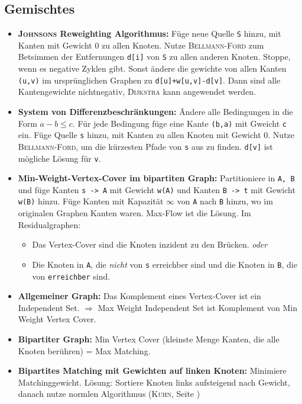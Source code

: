 \subsection{Gemischtes}
\begin{itemize}
	\item \textbf{\textsc{Johnsons} Reweighting Algorithmus:}
	Füge neue Quelle \lstinline{S} hinzu, mit Kanten mit Gewicht 0 zu allen Knoten.
	Nutze \textsc{Bellmann-Ford} zum Betsimmen der Entfernungen \lstinline{d[i]} von \lstinline{S} zu allen anderen Knoten.
	Stoppe, wenn es negative Zyklen gibt.
	Sonst ändere die gewichte von allen Kanten \lstinline{(u,v)} im ursprünglichen Graphen zu \lstinline{d[u]+w[u,v]-d[v]}.
	Dann sind alle Kantengewichte nichtnegativ, \textsc{Dijkstra} kann angewendet werden.

	\item \textbf{System von Differenzbeschränkungen:}
	Ändere alle Bedingungen in die Form $a-b \leq c$.
	Für jede Bedingung füge eine Kante \lstinline{(b,a)} mit Gweicht \lstinline{c} ein.
	Füge Quelle \lstinline{s} hinzu, mit Kanten zu allen Knoten mit Gewicht 0.
	Nutze \textsc{Bellmann-Ford}, um die kürzesten Pfade von \lstinline{s} aus zu finden.
	\lstinline{d[v]} ist mögliche Lösung für \lstinline{v}.

	\item \textbf{Min-Weight-Vertex-Cover im bipartiten Graph:}
	Partitioniere in \lstinline{A, B} und füge Kanten \lstinline{s -> A} mit Gewicht \lstinline{w(A)} und Kanten  \lstinline{B -> t} mit Gewicht \lstinline{w(B)} hinzu.
	Füge Kanten mit Kapazität $\infty$ von \lstinline{A} nach \lstinline{B} hinzu, wo im originalen Graphen Kanten waren.
	Max-Flow ist die Lösung.\newline
	Im Residualgraphen:
	\begin{itemize}[nosep]
		\item Das Vertex-Cover sind die Knoten inzident zu den Brücken. \emph{oder}
		\item Die Knoten in \lstinline{A}, die \emph{nicht} von \lstinline{s} erreichber sind und die Knoten in \lstinline{B}, die von \lstinline{erreichber} sind.
	\end{itemize}

	\item \textbf{Allgemeiner Graph:}
	Das Komplement eines Vertex-Cover ist ein Independent Set.
	$\Rightarrow$ Max Weight Independent Set ist Komplement von Min Weight Vertex Cover.

	\item \textbf{Bipartiter Graph:}
	Min Vertex Cover (kleinste Menge Kanten, die alle Knoten berühren) = Max Matching.

	\item \textbf{Bipartites Matching mit Gewichten auf linken Knoten:}
	Minimiere Matchinggewicht.
	Lösung: Sortiere Knoten links aufsteigend nach Gewicht, danach nutze normlen Algorithmus (\textsc{Kuhn}, Seite \pageref{kuhn})
\end{itemize}

